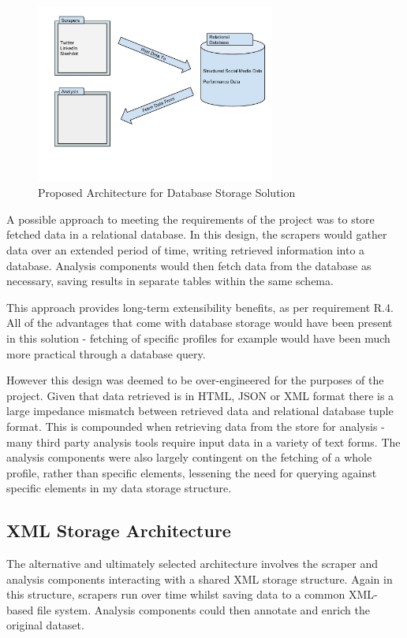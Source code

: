 \begin{figure}[h!]
 \centering
 \includegraphics[width=0.7\textwidth]{Images/Database_Architecture.pdf}
 \caption{Proposed Architecture for Database Storage Solution}
\end{figure}

A possible approach to meeting the requirements of the project was to store fetched data in a relational database. In this design, the scrapers would gather data over an extended period of time, writing retrieved information into a database. Analysis components would then fetch data from the database as necessary, saving results in separate tables within the same schema.

This approach provides long-term extensibility benefits, as per requirement R.4. All of the advantages that come with database storage would have been present in this solution - fetching of specific profiles for example would have been much more practical through a database query. 

However this design was deemed to be over-engineered for the purposes of the project. Given that data retrieved is in HTML, JSON or XML format there is a large impedance mismatch between retrieved data and relational database tuple format. This is compounded when retrieving data from the store for analysis - many third party analysis tools require input data in a variety of text forms.  The analysis components were also largely contingent on the fetching of a whole profile, rather than specific elements, lessening the need for querying against specific elements in my data storage structure. 

\subsection{XML Storage Architecture}

The alternative and ultimately selected architecture involves the scraper and analysis components interacting with a shared XML storage structure. Again in this structure, scrapers run over time whilst saving data to a common XML-based file system. Analysis components could then annotate and enrich the original dataset. 

